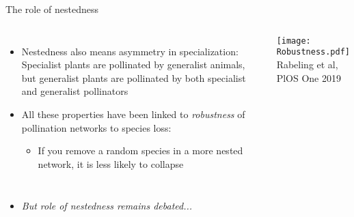 \begin{frame}{The role of nestedness}

  \begin{columns}[c]
      \begin{itemize}[<+->]\setlength{\itemindent}{0em}\itemsep10pt
        \item Nestedness also means asymmetry in specialization: Specialist
        plants are pollinated by generalist animals, but generalist plants are
        pollinated by both specialist and generalist pollinators\footnotemark
        \item All these properties have been linked to {\it robustness} of pollination networks to species loss:
        \begin{itemize}
          \item If you remove a random  species in a more nested network, it is less likely to collapse
        \end{itemize}
      \end{itemize}
    \centering
    \texttt{[image: Robustness.pdf]}	\\
    {\tiny Rabeling et al, PlOS One 2019}
  \end{columns}
  \begin{itemize} 
    \item \it But role of nestedness remains debated...
  \end{itemize}  
\end{frame}

